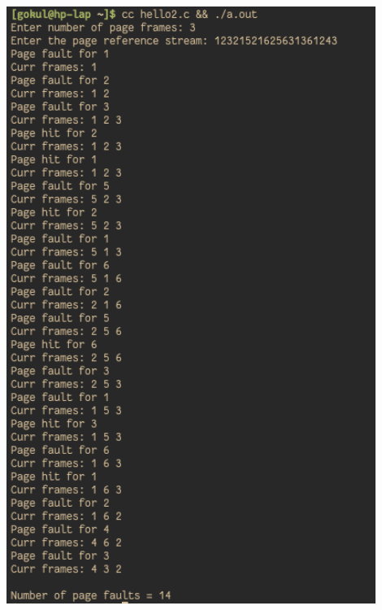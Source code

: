 \documentclass[13pt,oneside]{article}
\begin{document}
\includegraphics[width=0.9\textwidth]{img/q/ss3.png}
\end{document}
